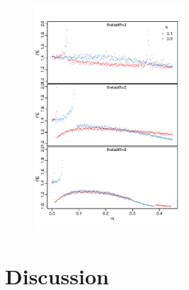 \documentclass[onecolumn,preprintnumbers,amsmath,amssymb,superscriptaddress]{revtex4}
\begin{document}
\begin{figure}[h]
\centering
\includegraphics[width=0.5\textwidth]{figs/fig_MDPE_hm_cross358.pdf}
\caption{} \label{fig:PE}
\end{figure}


\section*{Discussion}
\end{document}
